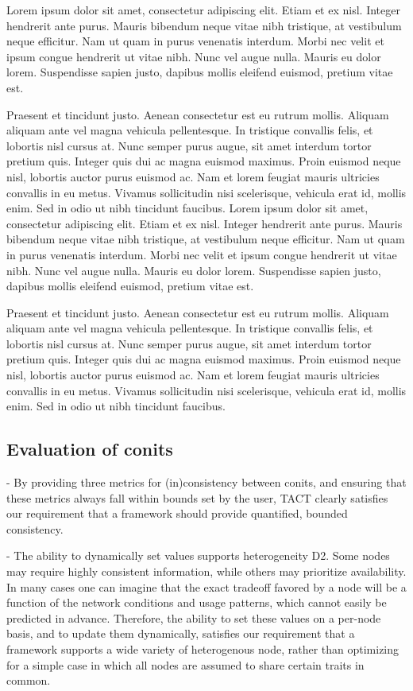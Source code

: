 Lorem ipsum dolor sit amet, consectetur adipiscing elit. Etiam et ex
nisl. Integer hendrerit ante purus. Mauris bibendum neque vitae nibh
tristique, at vestibulum neque efficitur. Nam ut quam in purus
venenatis interdum. Morbi nec velit et ipsum congue hendrerit ut vitae
nibh. Nunc vel augue nulla. Mauris eu dolor lorem. Suspendisse sapien
justo, dapibus mollis eleifend euismod, pretium vitae est.

Praesent et tincidunt justo. Aenean consectetur est eu rutrum
mollis. Aliquam aliquam ante vel magna vehicula pellentesque. In
tristique convallis felis, et lobortis nisl cursus at. Nunc semper
purus augue, sit amet interdum tortor pretium quis. Integer quis dui
ac magna euismod maximus. Proin euismod neque nisl, lobortis auctor
purus euismod ac. Nam et lorem feugiat mauris ultricies convallis in
eu metus. Vivamus sollicitudin nisi scelerisque, vehicula erat id,
mollis enim. Sed in odio ut nibh tincidunt faucibus.  Lorem ipsum
dolor sit amet, consectetur adipiscing elit. Etiam et ex nisl. Integer
hendrerit ante purus. Mauris bibendum neque vitae nibh tristique, at
vestibulum neque efficitur. Nam ut quam in purus venenatis
interdum. Morbi nec velit et ipsum congue hendrerit ut vitae
nibh. Nunc vel augue nulla. Mauris eu dolor lorem. Suspendisse sapien
justo, dapibus mollis eleifend euismod, pretium vitae est.

Praesent et tincidunt justo. Aenean consectetur est eu rutrum
mollis. Aliquam aliquam ante vel magna vehicula pellentesque. In
tristique convallis felis, et lobortis nisl cursus at. Nunc semper
purus augue, sit amet interdum tortor pretium quis. Integer quis dui
ac magna euismod maximus. Proin euismod neque nisl, lobortis auctor
purus euismod ac. Nam et lorem feugiat mauris ultricies convallis in
eu metus. Vivamus sollicitudin nisi scelerisque, vehicula erat id,
mollis enim. Sed in odio ut nibh tincidunt faucibus.

\subsection{Evaluation of conits}

- By providing three metrics for (in)consistency between conits, and
  ensuring that these metrics always fall within bounds set by the
  user, TACT clearly satisfies our requirement that a framework should
  provide quantified, bounded consistency.

- The ability to dynamically set values supports heterogeneity
  D2. Some nodes may require highly consistent information, while
  others may prioritize availability. In many cases one can imagine
  that the exact tradeoff favored by a node will be a function of the
  network conditions and usage patterns, which cannot easily be
  predicted in advance. Therefore, the ability to set these values on
  a per-node basis, and to update them dynamically, satisfies our
  requirement that a framework supports a wide variety of heterogenous
  node, rather than optimizing for a simple case in which all nodes
  are assumed to share certain traits in common.

